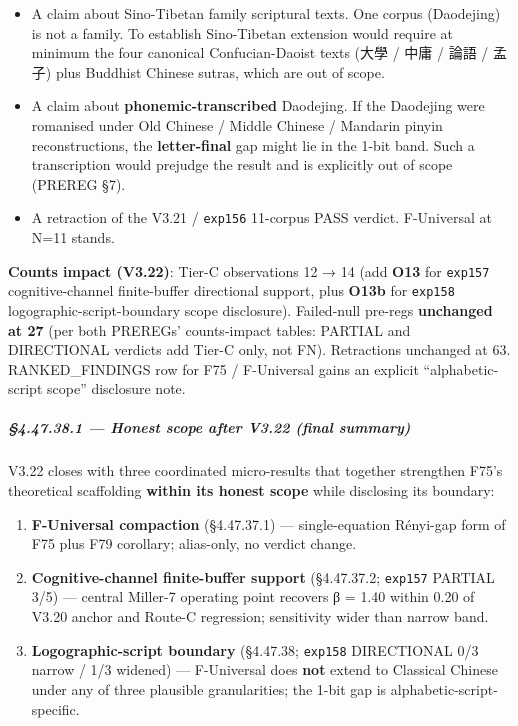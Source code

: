 \documentclass[
]{article}
\providecommand{\tightlist}{%
  \setlength{\itemsep}{0pt}\setlength{\parskip}{0pt}}
\begin{document}
\begin{itemize}
\tightlist
\item
  A claim about Sino-Tibetan family scriptural texts. One corpus
  (Daodejing) is not a family. To establish Sino-Tibetan extension would
  require at minimum the four canonical Confucian-Daoist texts (大學 /
  中庸 / 論語 / 孟子) plus Buddhist Chinese sutras, which are out of
  scope.
\item
  A claim about \textbf{phonemic-transcribed} Daodejing. If the
  Daodejing were romanised under Old Chinese / Middle Chinese / Mandarin
  pinyin reconstructions, the \textbf{letter-final} gap might lie in the
  1-bit band. Such a transcription would prejudge the result and is
  explicitly out of scope (PREREG §7).
\item
  A retraction of the V3.21 / \texttt{exp156} 11-corpus PASS verdict.
  F-Universal at N=11 stands.
\end{itemize}

\textbf{Counts impact (V3.22)}: Tier-C observations 12 → 14 (add
\textbf{O13} for \texttt{exp157} cognitive-channel finite-buffer
directional support, plus \textbf{O13b} for \texttt{exp158}
logographic-script-boundary scope disclosure). Failed-null pre-regs
\textbf{unchanged at 27} (per both PREREGs' counts-impact tables:
PARTIAL and DIRECTIONAL verdicts add Tier-C only, not FN). Retractions
unchanged at 63. RANKED\_FINDINGS row for F75 / F-Universal gains an
explicit ``alphabetic-script scope'' disclosure note.

\subparagraph{§4.47.38.1 --- Honest scope after V3.22 (final
summary)}\label{honest-scope-after-v3.22-final-summary}

V3.22 closes with three coordinated micro-results that together
strengthen F75's theoretical scaffolding \textbf{within its honest
scope} while disclosing its boundary:

\begin{enumerate}
\def\labelenumi{\arabic{enumi}.}
\tightlist
\item
  \textbf{F-Universal compaction} (§4.47.37.1) --- single-equation
  Rényi-gap form of F75 plus F79 corollary; alias-only, no verdict
  change.
\item
  \textbf{Cognitive-channel finite-buffer support} (§4.47.37.2;
  \texttt{exp157} PARTIAL 3/5) --- central Miller-7 operating point
  recovers β = 1.40 within 0.20 of V3.20 anchor and Route-C regression;
  sensitivity wider than narrow band.
\item
  \textbf{Logographic-script boundary} (§4.47.38; \texttt{exp158}
  DIRECTIONAL 0/3 narrow / 1/3 widened) --- F-Universal does
  \textbf{not} extend to Classical Chinese under any of three plausible
  granularities; the 1-bit gap is alphabetic-script-specific.
\end{enumerate}
\end{document}
